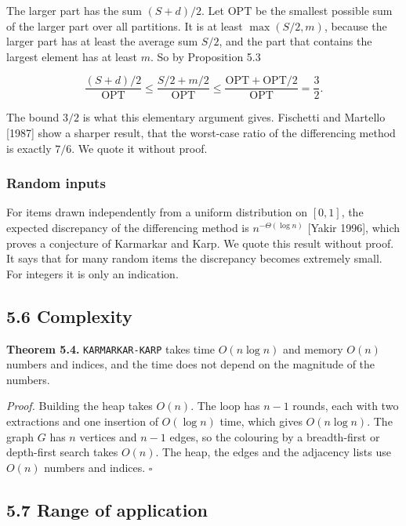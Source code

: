 \documentclass[
]{article}
\begin{document}
The larger part has the sum \((S + d)/2\). Let \(\mathrm{OPT}\) be the
smallest possible sum of the larger part over all partitions. It is at
least \(\max(S/2, m)\), because the larger part has at least the average
sum \(S/2\), and the part that contains the largest element has at least
\(m\). So by Proposition 5.3

\[
\frac{(S + d)/2}{\mathrm{OPT}} \le \frac{S/2 + m/2}{\mathrm{OPT}} \le \frac{\mathrm{OPT} + \mathrm{OPT}/2}{\mathrm{OPT}} = \frac{3}{2} .
\]

The bound \(3/2\) is what this elementary argument gives. Fischetti and
Martello {[}1987{]} show a sharper result, that the worst-case ratio of
the differencing method is exactly \(7/6\). We quote it without proof.

\hypertarget{random-inputs}{%
\subsubsection{Random inputs}\label{random-inputs}}

For items drawn independently from a uniform distribution on \([0, 1]\),
the expected discrepancy of the differencing method is
\(n^{-\Theta(\log n)}\) {[}Yakir 1996{]}, which proves a conjecture of
Karmarkar and Karp. We quote this result without proof. It says that for
many random items the discrepancy becomes extremely small. For integers
it is only an indication.

\hypertarget{complexity-3}{%
\subsection{5.6 Complexity}\label{complexity-3}}

\textbf{Theorem 5.4.} \texttt{KARMARKAR-KARP} takes time \(O(n \log n)\)
and memory \(O(n)\) numbers and indices, and the time does not depend on
the magnitude of the numbers.

\emph{Proof.} Building the heap takes \(O(n)\). The loop has \(n - 1\)
rounds, each with two extractions and one insertion of \(O(\log n)\)
time, which gives \(O(n \log n)\). The graph \(G\) has \(n\) vertices
and \(n - 1\) edges, so the colouring by a breadth-first or depth-first
search takes \(O(n)\). The heap, the edges and the adjacency lists use
\(O(n)\) numbers and indices. \(\square\)

\hypertarget{range-of-application-2}{%
\subsection{5.7 Range of application}\label{range-of-application-2}}
\end{document}
